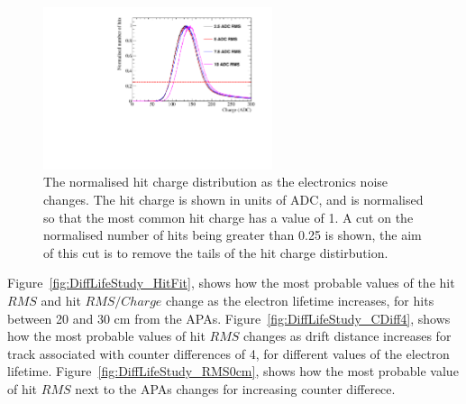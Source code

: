 \begin{figure}[h!]
  \centering
  \includegraphics[width=0.6\textwidth]{Canvas_ChargeCut_NoiseLevel}
  \caption[The normalised hit charge distribution as the electronics noise changes]
          {The normalised hit charge distribution as the electronics noise changes. The hit charge is shown in units of ADC, and is normalised so that the most common hit charge has a value of 1. A cut on the normalised number of hits being greater than 0.25 is shown, the aim of this cut is to remove the tails of the hit charge distirbution.}
  \label{fig:DiffNoiseStudy_ChargeCut}
\end{figure}

Figure~\ref{fig:DiffLifeStudy_HitFit}, shows how the most probable values of the hit $RMS$ and hit $RMS/Charge$ change as the electron lifetime increases, for hits between 20 and 30 cm from the APAs. Figure~\ref{fig:DiffLifeStudy_CDiff4}, shows how the most probable values of hit $RMS$ changes as drift distance increases for track associated with counter differences of 4, for different values of the electron lifetime. Figure~\ref{fig:DiffLifeStudy_RMS0cm}, shows how the most probable value of hit $RMS$ next to the APAs changes for increasing counter differece. \\ 

